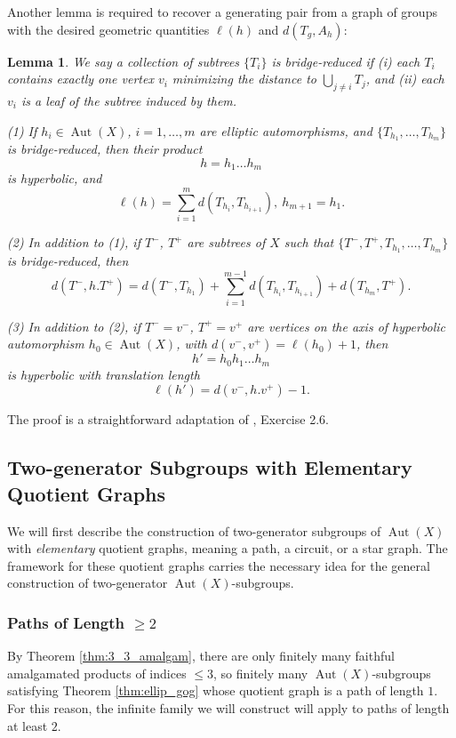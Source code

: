 \documentclass[12pt,leqno]{amsart}
\newcommand{\2}{L^2_{\rm per}(0, T)}
\newtheorem{lem}{Lemma}[section]
\newcommand{\aut}{{\operatorname{Aut}}}
\numberwithin{equation}{section}
\numberwithin{figure}{section}
\begin{document}
Another lemma is required to recover a generating pair from a graph of groups with the desired geometric quantities $\ell(h)$ and $d(T_g,A_h)$:
\begin{lem}\label{lem:geom_quant}
    We say a collection of subtrees $\{T_i\}$ is \emph{bridge-reduced} if (i) each $T_i$ contains exactly one vertex $v_i$ minimizing the distance to $\bigcup_{j\neq i} T_j$, and (ii) each $v_i$ is a leaf of the subtree induced by them.
    
    (1) If $h_i\in \aut(X)$, $i=1,\dots, m$ are elliptic automorphisms, and $\{T_{h_1},\dots, T_{h_m}\}$ is bridge-reduced, then their product
    \[
    h = h_1\dots h_m
    \]
    is hyperbolic, and
    \[
    \ell(h) = \sum_{i=1}^m d(T_{h_i},T_{h_{i+1}}),\ h_{m+1} = h_1.
    \]

    (2) In addition to (1), if $T^-$, $T^+$ are subtrees of $X$ such that $\{T^-, T^+, T_{h_1},\dots, T_{h_m}\}$ is bridge-reduced, then
    \[
    d(T^-, h.T^+) = d(T^-,T_{h_1}) + \sum_{i=1}^{m-1} d(T_{h_i},T_{h_{i+1}}) + d(T_{h_m}, T^+).
    \]

    (3) In addition to (2), if $T^- = v^-$, $T^+ = v^+$ are vertices on the axis of hyperbolic automorphism $h_0\in\aut(X)$, with $d(v^-,v^+) = \ell(h_0) + 1$, then
    \[
    h' = h_0h_1\dots h_m
    \]
    is hyperbolic with translation length
    \[
    \ell(h') = d(v^-,h.v^+) -1.
    \]
\end{lem}
The proof is a straightforward adaptation of \cite{bestvina2002r}, Exercise 2.6.

\subsection{Two-generator Subgroups with Elementary Quotient Graphs}
We will first describe the construction of two-generator subgroups of $\aut(X)$ with \emph{elementary} quotient graphs, meaning a path, a circuit, or a star graph. The framework for these quotient graphs carries the necessary idea for the general construction of two-generator $\aut(X)$-subgroups.

\subsubsection{Paths of Length \texorpdfstring{$\geq 2$}{>=2}}
By Theorem \ref{thm:3_3_amalgam}, there are only finitely many faithful amalgamated products of indices $\leq 3$, so finitely many $\aut(X)$-subgroups satisfying Theorem \ref{thm:ellip_gog} whose quotient graph is a path of length $1$. For this reason, the infinite family we will construct will apply to paths of length at least $2$.
\end{document}
